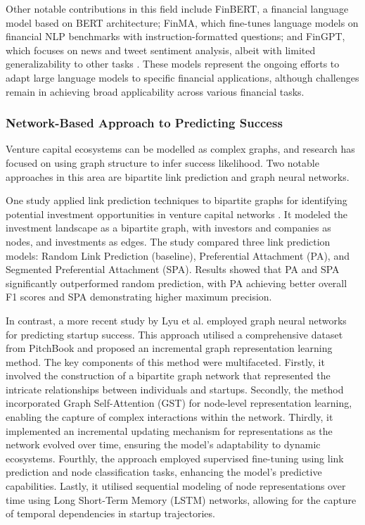 \documentclass[a4paper, oneside]{discothesis}
\begin{document}
Other notable contributions in this field include FinBERT, a financial language model based on BERT architecture; FinMA, which fine-tunes language models on financial NLP benchmarks with instruction-formatted questions; and FinGPT, which focuses on news and tweet sentiment analysis, albeit with limited generalizability to other tasks \cite{araci2019finbert, xie2023pixiulargelanguagemodel, yang2023fingpt}. These models represent the ongoing efforts to adapt large language models to specific financial applications, although challenges remain in achieving broad applicability across various financial tasks.

\subsubsection{Network-Based Approach to Predicting Success}

Venture capital ecosystems can be modelled as complex graphs, and research has focused on using graph structure to infer success likelihood. Two notable approaches in this area are bipartite link prediction and graph neural networks.

One study applied link prediction techniques to bipartite graphs for identifying potential investment opportunities in venture capital networks \cite{predictVCbipartite}. It modeled the investment landscape as a bipartite graph, with investors and companies as nodes, and investments as edges. The study compared three link prediction models: Random Link Prediction (baseline), Preferential Attachment (PA), and Segmented Preferential Attachment (SPA). Results showed that PA and SPA significantly outperformed random prediction, with PA achieving better overall F1 scores and SPA demonstrating higher maximum precision.

In contrast, a more recent study by Lyu et al. \cite{lyu2021graph} employed graph neural networks for predicting startup success. This approach utilised a comprehensive dataset from PitchBook and proposed an incremental graph representation learning method. The key components of this method were multifaceted. Firstly, it involved the construction of a bipartite graph network that represented the intricate relationships between individuals and startups. Secondly, the method incorporated Graph Self-Attention (GST) for node-level representation learning, enabling the capture of complex interactions within the network. Thirdly, it implemented an incremental updating mechanism for representations as the network evolved over time, ensuring the model's adaptability to dynamic ecosystems. Fourthly, the approach employed supervised fine-tuning using link prediction and node classification tasks, enhancing the model's predictive capabilities. Lastly, it utilised sequential modeling of node representations over time using Long Short-Term Memory (LSTM) networks, allowing for the capture of temporal dependencies in startup trajectories.
\end{document}
